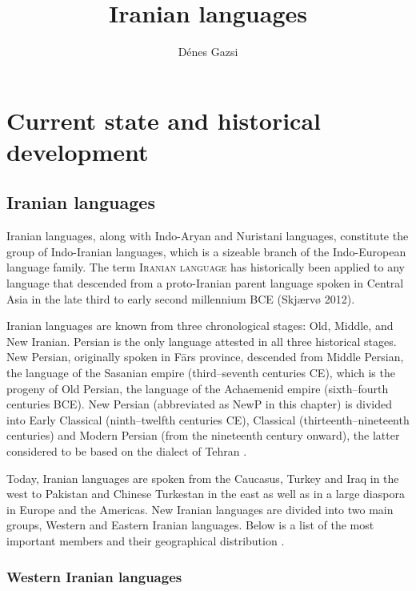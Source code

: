 \documentclass[output=paper]{langsci/langscibook}
\author{Dénes Gazsi\affiliation{The University of Iowa}}
\title{Iranian languages}
\begin{document}
\maketitle 

\section{Current state and historical development}

\subsection{Iranian languages}

Iranian languages, along with Indo-Aryan and Nuristani languages, constitute the group of Indo-Iranian languages, which is a sizeable branch of the Indo-European language family. The term \textsc{Iranian} \textsc{language} has historically been applied to any language that descended from a proto-Iranian parent language spoken in Central Asia in the late third to early second millennium BCE (Skjærvø 2012).

Iranian languages are known from three chronological stages: Old, Middle, and New Iranian. Persian is the only language attested in all three historical stages. New Persian, originally spoken in Fārs province, descended from Middle Persian, the language of the Sasanian empire (third–seventh centuries CE), which is the progeny of Old Persian, the language of the Achaemenid empire (sixth–fourth centuries BCE). New Persian (abbreviated as NewP in this chapter) is divided into Early Classical (ninth–twelfth centuries CE), Classical (thirteenth–nineteenth centuries) and Modern Persian (from the nineteenth century onward), the latter considered to be based on the dialect of Tehran \citep[427]{Jeremiás2003}.

Today, Iranian languages are spoken from the Caucasus, Turkey and Iraq in the west to Pakistan and Chinese Turkestan in the east as well as in a large diaspora in Europe and the Americas. New Iranian languages are divided into two main groups, Western and Eastern Iranian languages. Below is a list of the most important members and their geographical distribution \citep[246]{Schmitt1989}.


\subsubsection{Western Iranian languages}
\end{document}
